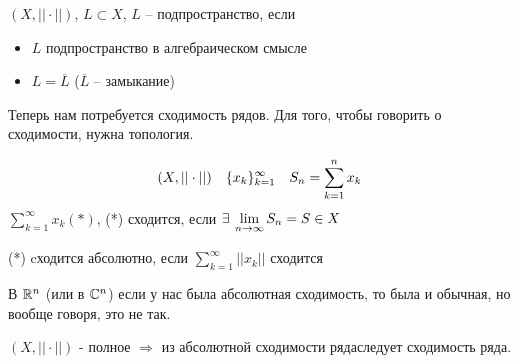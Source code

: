 \documentclass[document]{subfiles}
\begin{document}
\begin{definition}[подпространство]
    $(X, || \cdot ||)$, $L \subset X$, $L$ -- подпространство, если
    \begin{itemize}
        \item $L$ подпространство в алгебраическом смысле
        \item $L = \overline{L}$ ($\overline{L}$ -- замыкание)
    \end{itemize}
\end{definition}

Теперь нам потребуется сходимость рядов. Для того, чтобы говорить о сходимости, нужна топология.

\begin{definition}[Cходимость]
    \[(X, || \cdot ||) \quad \{x_k\}^\infty_{k=1} \quad S_n = \sum^n_{k=1} x_k \]
    $\sum_{k=1}^\infty x_k (*)$,  
    (*) сходится, если $\exists \liml_{n \to \infty}{S_n} = S \in X$

    (*) cходится абсолютно, если $\sum^\infty_{k=1} ||x_k||$ сходится
\end{definition}
В $\mathbb{R}^n$ (или в $\mathbb{C}^n$) если у нас была абсолютная сходимость, то была и обычная, но вообще говоря, это не так.

\begin{theorem}
    $(X, || \cdot||)$ - полное $\Rightarrow$ из абсолютной сходимости рядаследует сходимость ряда.
\end{theorem}
\end{document}
